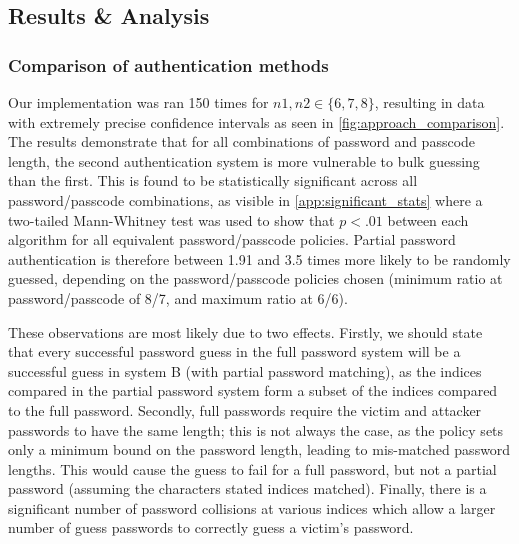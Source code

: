 \documentclass[british,11pt,a4paper]{article}
\begin{document}
\subsection{Results \& Analysis}
\subsubsection{Comparison of authentication methods}
\label{subsec:authentication_methods}
Our implementation was ran 150 times for $n1, n2 \in \{6,7,8\}$, resulting in data with extremely precise confidence intervals as seen in \autoref{fig:approach_comparison}. The results demonstrate that for all combinations of password and passcode length, the second authentication system is more vulnerable to bulk guessing than the first. This is found to be statistically significant across all password/passcode combinations, as visible in \autoref{app:significant_stats} where a two-tailed Mann-Whitney test was used to show that $p<.01$ between each algorithm for all equivalent password/passcode policies. Partial password authentication is therefore between 1.91 and 3.5 times more likely to be randomly guessed, depending on the password/passcode policies chosen (minimum ratio at password/passcode of 8/7, and maximum ratio at 6/6).

These observations are most likely due to two effects. Firstly, we should state that every successful password guess in the full password system will be a successful guess in system B (with partial password matching), as the indices compared in the partial password system form a subset of the indices compared to the full password. Secondly, full passwords require the victim and attacker passwords to have the same length; this is not always the case, as the policy sets only a minimum bound on the password length, leading to mis-matched password lengths. This would cause the guess to fail for a full password, but not a partial password (assuming the characters stated indices matched). Finally, there is a significant number of password collisions at various indices which allow a larger number of guess passwords to correctly guess a victim's password. 
\end{document}

